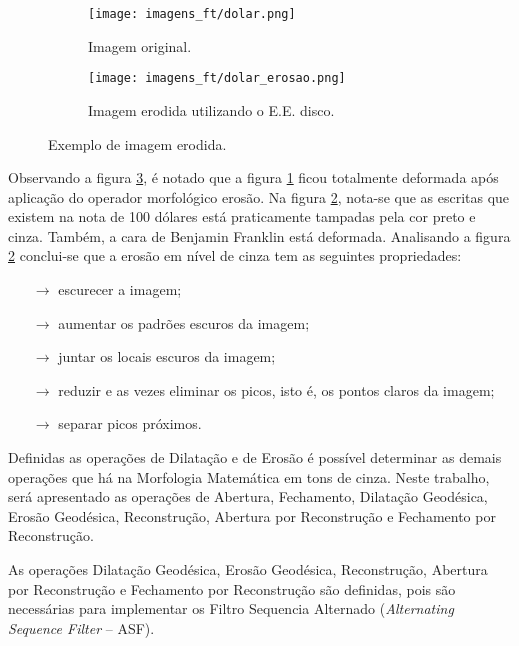 \begin{figure}[h]
	\centering
	\begin{subfigure}[b]{0.45\textwidth}
		\centering
		\texttt{[image: imagens\_ft/dolar.png]}
		\caption{Imagem original.}
		\label{fig:dolar_mm_e}
	\end{subfigure}
	\hfill
	\begin{subfigure}[b]{0.45\textwidth}
		\centering
		\texttt{[image: imagens\_ft/dolar\_erosao.png]}
		\caption{Imagem erodida utilizando o E.E. disco.}
		\label{fig:dolar_mm_erosao}
	\end{subfigure}
	\caption{Exemplo de imagem erodida.}
	\label{fig:erosao_cinza}
\end{figure}

Observando a figura \ref{fig:erosao_cinza}, é notado que a figura \ref{fig:dolar_mm_e} ficou totalmente deformada após aplicação do operador morfológico erosão. Na figura \ref{fig:dolar_mm_erosao}, nota-se que as escritas que existem na nota de 100 dólares está praticamente tampadas pela cor preto e cinza. Também, a cara de Benjamin Franklin está deformada. Analisando a figura \ref{fig:dolar_mm_erosao} conclui-se que a erosão em nível de cinza tem as seguintes propriedades: 

\begin{itemize}
	\item[$\rightarrow$] escurecer a imagem;
	\item[$\rightarrow$] aumentar os padrões escuros da imagem;
	\item[$\rightarrow$] juntar os locais escuros da imagem;
	\item[$\rightarrow$] reduzir e as vezes eliminar os picos, isto é, os pontos claros da imagem;
	\item[$\rightarrow$] separar picos próximos.
\end{itemize}

Definidas as operações de Dilatação e de Erosão é possível determinar as demais operações que há na Morfologia Matemática em tons de cinza. Neste trabalho, será apresentado as operações de Abertura, Fechamento, Dilatação Geodésica, Erosão Geodésica, Reconstrução, Abertura por Reconstrução e Fechamento por Reconstrução.

As operações Dilatação Geodésica, Erosão Geodésica, Reconstrução, Abertura por Reconstrução e Fechamento por Reconstrução são definidas, pois são necessárias para implementar os Filtro Sequencia Alternado (\textit{Alternating Sequence Filter} – ASF).

